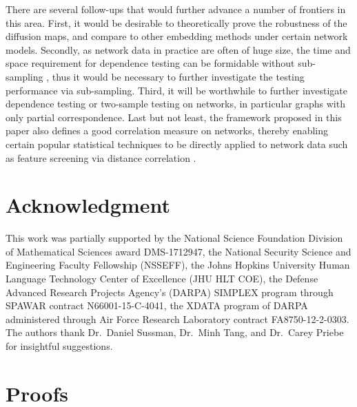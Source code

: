 \documentclass[12pt]{article}
\theoremstyle{definition}
\begin{document}
	There are several follow-ups that would further advance a number of frontiers in this area. First, it would be desirable to theoretically prove the robustness of the diffusion maps, and compare to other embedding methods under certain network models. Secondly, as network data in practice are often of huge size, the time and space requirement for dependence testing can be formidable without sub-sampling \citep{zhang2017large}, thus it would be necessary to further investigate the testing performance via sub-sampling. Third, it will be worthwhile to further investigate dependence testing or two-sample testing on networks, in particular graphs with only partial correspondence. Last but not least, the framework proposed in this paper also defines a good correlation measure on networks, thereby enabling certain popular statistical techniques to be directly applied to network data such as feature screening via distance correlation \citep{LiZhongZhu2012}.
	
	\clearpage
	
	
	
	\section*{Acknowledgment}
	This work was partially supported by 
	the National Science Foundation Division of Mathematical Sciences award DMS-1712947,
	the National Security Science and Engineering Faculty Fellowship (NSSEFF),
	the Johns Hopkins University Human Language Technology Center of Excellence (JHU HLT COE), 
	the Defense Advanced Research Projects Agency's (DARPA) SIMPLEX program through SPAWAR contract N66001-15-C-4041,
	the XDATA program of DARPA administered through Air Force Research Laboratory contract FA8750-12-2-0303.
	The authors thank Dr.~Daniel Sussman, Dr.~Minh Tang,  and Dr.~Carey Priebe for insightful suggestions.
	
	\clearpage
	\appendix
	\section{Proofs}
	\label{ssec:proof}
	
\end{document}

